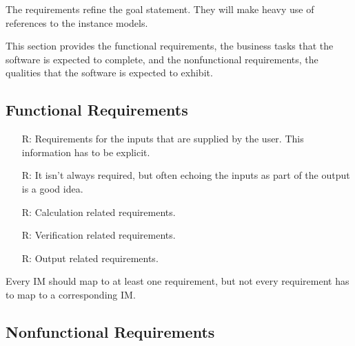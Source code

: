 \documentclass[12pt]{article}
\newcounter{reqnum} %
\begin{document}
The requirements refine the goal statement.  They will make heavy use of
references to the instance models.

This section provides the functional requirements, the business tasks that the
software is expected to complete, and the nonfunctional requirements, the
qualities that the software is expected to exhibit.

\subsection{Functional Requirements}

\noindent \begin{itemize}

\item[R\refstepcounter{reqnum}\thereqnum \label{R_Inputs}:] Requirements
    for the inputs that are supplied by the user.  This information has to be
    explicit.

\item[R\refstepcounter{reqnum}\thereqnum \label{R_OutputInputs}:] It isn't
    always required, but often echoing the inputs as part of the output is a
    good idea.

\item[R\refstepcounter{reqnum}\thereqnum \label{R_Calculate}:] Calculation
    related requirements.

\item[R\refstepcounter{reqnum}\thereqnum \label{R_VerifyOutput}:]
  Verification related requirements.

\item[R\refstepcounter{reqnum}\thereqnum \label{R_Output}:] Output related
    requirements.

\end{itemize}

Every IM should map to at least one requirement, but not every requirement has
to map to a corresponding IM.

\subsection{Nonfunctional Requirements}
\end{document}
